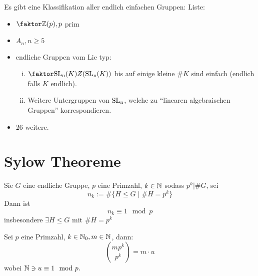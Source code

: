 \documentclass[a4paper]{report}
\begin{document}
\begin{bem*}
  Es gibt eine Klassifikation aller endlich einfachen Gruppen:
  Liste:
  \begin{itemize}
    \item $\fak \Z{(p)}, p$ prim
    \item $A_{n}, n \ge 5$
    \item endliche Gruppen vom Lie typ:
          \begin{enumerate}[(i)]
            \item $\fak {\SLn(K)}{Z(\SLn(K))}$ bis auf einige kleine $\#K$ sind einfach (endlich falls $K$ endlich).
            \item Weitere Untergruppen von $\operatorname{SL_n}$, welche zu ``linearen algebraischen Gruppen'' korrespondieren.
          \end{enumerate}
          \item 26 weitere.
  \end{itemize}
\end{bem*}

\section{Sylow Theoreme}
\begin{satz}
  Sie $G$ eine endliche Gruppe, $p$ eine Primzahl, $k \in \mathbb{N}$ sodass $p^{k} | \#G$, sei
  \[n_{k}:= \#\{H \le G \mid \#H = p^{k}\}\]
  Dann ist
  \[n_{k} \equiv 1 \mod p\]
  insbesondere $\exists H \le G$ mit $\#H = p^{k}$
\end{satz}
\begin{ubng*}[Vorbereitung]
  Sei $p$ eine Primzahl, $k \in \mathbb{N}_0, m \in \mathbb{N}$, dann:
  \[\binom {mp^{k}}{p^{k}} = m \cdot u\]
  wobei $\mathbb{N} \ni u \equiv 1 \mod p.$
\end{ubng*}
\end{document}
